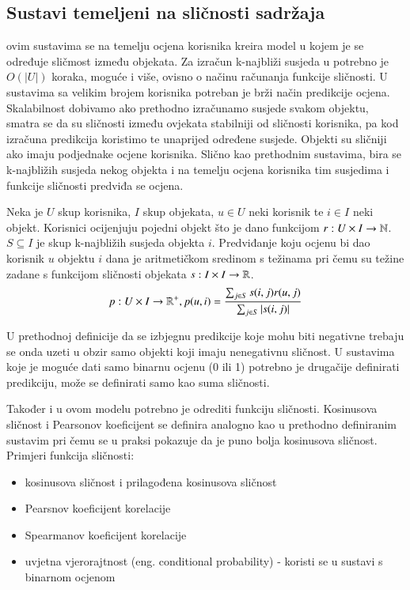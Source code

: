 \documentclass[a4paper,oneside,12pt]{memoir} %
\begin{document}
\subsection{Sustavi temeljeni na sličnosti sadržaja}
\par 
ovim sustavima se na temelju ocjena korisnika kreira model u kojem je se određuje sličmost između objekata. Za izračun k-najbliži susjeda u potrebno je $O(|U|)$ koraka, moguće i više, ovisno o načinu računanja funkcije sličnosti. U sustavima sa velikim brojem korisnika potreban je brži način predikcije ocjena. Skalabilnost dobivamo ako prethodno izračunamo susjede svakom objektu, smatra se da su sličnosti između ovjekata stabilniji od sličnosti korisnika, pa kod izračuna predikcija koristimo te unaprijed određene susjede. Objekti su sličniji ako imaju podjednake ocjene korisnika. Slično kao prethodnim sustavima, bira se k-najbližih susjeda nekog objekta i na temelju ocjena korisnika tim susjedima i funkcije sličnosti predviđa se ocjena.
\begin{defn}
Neka je $U$ skup korisnika, $I$ skup objekata, $u\in U$ neki korisnik te $i\in I$ neki objekt. Korisnici ocijenjuju pojedni objekt što je dano funkcijom $r:U\times I \rightarrow \mathbb{N}$. $S \subseteq I$ je skup k-najbližih susjeda objekta $i$. Predviđanje koju ocjenu bi dao korisnik $u$ objektu $i$ dana je aritmetičkom sredinom s težinama pri čemu su težine zadane s funkcijom sličnosti objekata $s:I\times I\rightarrow \mathbb{R}$. 
\[ p:U\times I \rightarrow \mathbb{R}^+, p(u,i) = \frac{\sum_{j\in S}s(i,j)r(u,j)}{\sum_{j\in S}|s(i,j)|} \]
\end{defn}
\begin{rem}
U prethodnoj definicije da se izbjegnu predikcije koje mohu biti negativne trebaju se onda uzeti u obzir samo objekti koji imaju nenegativnu sličnost. U sustavima koje je moguće dati samo binarnu ocjenu (0 ili 1) potrebno je drugačije definirati predikciju, može se definirati samo kao suma sličnosti.
\end{rem}
Također i u ovom modelu potrebno je odrediti funkciju sličnosti. Kosinusova sličnost i Pearsonov koeficijent se definira analogno kao u prethodno definiranim sustavim pri čemu se u praksi pokazuje da je puno bolja kosinusova sličnost.
\bigskip
\\Primjeri funkcija sličnosti:
\begin{itemize}[topsep=2pt]
\setlength{\parskip}{0pt}
\item kosinusova sličnost i prilagođena kosinusova sličnost
\item Pearsnov koeficijent korelacije 
\item Spearmanov koeficijent korelacije 
\item uvjetna vjerorajtnost (eng. conditional probability) - koristi se u sustavi s binarnom ocjenom
\end{itemize}
\end{document}
